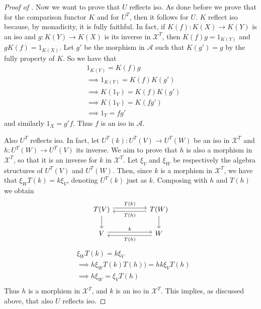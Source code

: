 \begin{subbox}{}
\begin{proof}[\textit{Proof of }]
    Now we want to prove that $U$ reflects iso. As done before we prove that for the comparison functor $K$ and for $U^T$, then it follows for $U$. $K$ reflect iso because, by monadicity, it is fully faithful. In fact, if $K(f):K(X) \to K(Y)$ is an iso and $g: K(Y) \to K(X)$ is its inverse in $\mathcal{X}^T$, then $K(f)g=1_{K(Y)}$ and $gK(f)=1_{K(X)}$. Let $g'$ be the morphism in $\mathcal{A}$ such that $K(g') = g$ by the fully property of $K$. So we have that
    \begin{align*}
        &1_{K(Y)} = K(f)g\\[1.5ex]
        &\implies 1_{K(Y)} = K(f)K(g')\\[1.5ex]
        &\implies K(1_Y) = K(f)K(g')\\[1.5ex]
        &\implies K(1_Y) = K(fg')\\[1.5ex]
        &\implies 1_Y = fg'
    \end{align*}
    and similarly $1_X = g'f$. Thus $f$ is an iso in $\mathcal{A}$.

    Also $U^T$ reflects iso. In fact, let $U^T(k):U^T(V) \to U^T(W)$ be an iso in $\mathcal{X}^T$ and $h:U^T(W) \to U^T(V)$ its inverse. We aim to prove that $h$ is also a morphism in $\mathcal{X}^T$, so that it is an inverse for $k$ in $\mathcal{X}^T$. Let $\xi_V$ and $\xi_W$ be respectively the algebra structures of $U^T(V)$ and $U^T(W)$. Then, since $k$ is a morphism in $\mathcal{X}^T$, we have that $\xi_W T(k) = k \xi_V$, denoting $U^T(k)$ just as $k$. Composing with $h$ and $T(h)$ we obtain
    \[
\begin{tikzcd}
T(V) \arrow[d] \arrow[rr, "T(k)", shift left] &  & T(W) \arrow[d] \arrow[ll, "T(h)", shift left] \\
V \arrow[rr, "k", shift left]                 &  & W \arrow[ll, "T(h)", shift left]             
\end{tikzcd}
    \]
    \begin{align*}
        &\xi_W T(k) = k \xi_V\\[1.5ex]
        &\implies h \xi_W T(k) T(h)) = h k \xi_V T(h)\\[1.5ex]
        &\implies h \xi_W = \xi_V T(h)\\[1.5ex]
    \end{align*}
    Thus $h$ is a morphism in $\mathcal{X}^T$, and $k$ is an iso in $\mathcal{X}^T$. This implies, as discussed above, that also $U$ reflects iso.
    

\end{proof}
\end{subbox}
